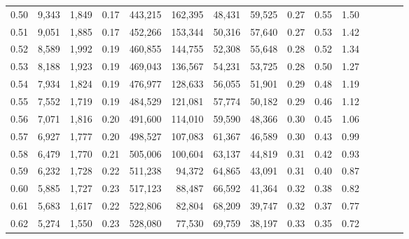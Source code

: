 \begin{tabular}{rrrcrrrrrrrrrrr}
0.50 &   9,343 &  1,849 &                                       0.17 &  443,215 &  162,395 &   48,431 &   59,525 &  0.27 &  0.55 &                         1.50 \\
0.51 &   9,051 &  1,885 &                                       0.17 &  452,266 &  153,344 &   50,316 &   57,640 &  0.27 &  0.53 &                         1.42 \\
0.52 &   8,589 &  1,992 &                                       0.19 &  460,855 &  144,755 &   52,308 &   55,648 &  0.28 &  0.52 &                         1.34 \\
0.53 &   8,188 &  1,923 &                                       0.19 &  469,043 &  136,567 &   54,231 &   53,725 &  0.28 &  0.50 &                         1.27 \\
0.54 &   7,934 &  1,824 &                                       0.19 &  476,977 &  128,633 &   56,055 &   51,901 &  0.29 &  0.48 &                         1.19 \\
0.55 &   7,552 &  1,719 &                                       0.19 &  484,529 &  121,081 &   57,774 &   50,182 &  0.29 &  0.46 &                         1.12 \\
0.56 &   7,071 &  1,816 &                                       0.20 &  491,600 &  114,010 &   59,590 &   48,366 &  0.30 &  0.45 &                         1.06 \\
0.57 &   6,927 &  1,777 &                                       0.20 &  498,527 &  107,083 &   61,367 &   46,589 &  0.30 &  0.43 &                         0.99 \\
0.58 &   6,479 &  1,770 &                                       0.21 &  505,006 &  100,604 &   63,137 &   44,819 &  0.31 &  0.42 &                         0.93 \\
0.59 &   6,232 &  1,728 &                                       0.22 &  511,238 &   94,372 &   64,865 &   43,091 &  0.31 &  0.40 &                         0.87 \\
0.60 &   5,885 &  1,727 &                                       0.23 &  517,123 &   88,487 &   66,592 &   41,364 &  0.32 &  0.38 &                         0.82 \\
0.61 &   5,683 &  1,617 &                                       0.22 &  522,806 &   82,804 &   68,209 &   39,747 &  0.32 &  0.37 &                         0.77 \\
0.62 &   5,274 &  1,550 &                                       0.23 &  528,080 &   77,530 &   69,759 &   38,197 &  0.33 &  0.35 &                         0.72 \\

\end{tabular}
